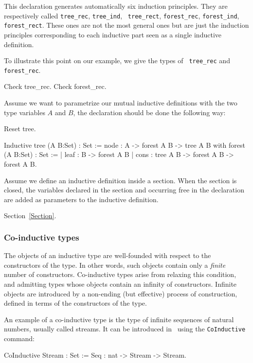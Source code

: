 This declaration generates automatically six induction
principles. They are respectively 
called {\tt tree\_rec}, {\tt tree\_ind}, {\tt
  tree\_rect}, {\tt forest\_rec}, {\tt forest\_ind}, {\tt
  forest\_rect}.  These ones are not the most general ones but are
just the induction principles corresponding to each inductive part
seen as a single inductive definition.

To illustrate this point on our example, we give the types of {\tt
  tree\_rec} and {\tt forest\_rec}.

\begin{coq_example}
Check tree_rec.
Check forest_rec.
\end{coq_example}

Assume we want to parametrize our mutual inductive definitions with
the two type variables $A$ and $B$, the declaration should be done the
following way:

\begin{coq_eval}
Reset tree.
\end{coq_eval}
\begin{coq_example*}
Inductive tree (A B:Set) : Set :=
    node : A -> forest A B -> tree A B
with forest (A B:Set) : Set :=
  | leaf : B -> forest A B
  | cons : tree A B -> forest A B -> forest A B.
\end{coq_example*}

Assume we define an inductive definition inside a section.  When the
section is closed, the variables declared in the section and occurring
free in the declaration are added as parameters to the inductive
definition. 

\SeeAlso Section~\ref{Section}.

\subsubsection{Co-inductive types
\label{CoInductiveTypes}
}

The objects of an inductive type are well-founded with respect to the
constructors of the type. In other words, such objects contain only a
{\it finite} number of constructors. Co-inductive types arise from
relaxing this condition, and admitting types whose objects contain an
infinity of constructors. Infinite objects are introduced by a
non-ending (but effective) process of construction, defined in terms
of the constructors of the type.

An example of a co-inductive type is the type of infinite sequences of
natural numbers, usually called streams. It can be introduced in \Coq\
using the \texttt{CoInductive} command:
\begin{coq_example}
CoInductive Stream : Set :=
    Seq : nat -> Stream -> Stream.
\end{coq_example}

